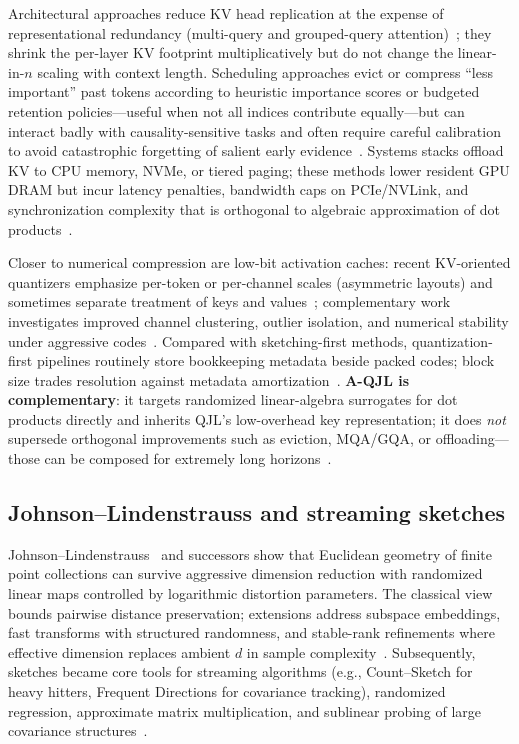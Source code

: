 \documentclass[conference]{IEEEtran}
\begin{document}
Architectural approaches reduce KV head replication at the expense of representational redundancy (multi-query and grouped-query attention)~\cite{shazeer2019mqa}; they shrink the per-layer KV footprint multiplicatively but do not change the linear-in-\(n\) scaling with context length. Scheduling approaches evict or compress ``less important'' past tokens according to heuristic importance scores or budgeted retention policies---useful when not all indices contribute equally---but can interact badly with causality-sensitive tasks and often require careful calibration to avoid catastrophic forgetting of salient early evidence~\cite{bai2023longbench}. Systems stacks offload KV to CPU memory, NVMe, or tiered paging; these methods lower resident GPU DRAM but incur latency penalties, bandwidth caps on PCIe/NVLink, and synchronization complexity that is orthogonal to algebraic approximation of dot products~\cite{presentation_mqjl}.

Closer to numerical compression are low-bit activation caches: recent KV-oriented quantizers emphasize per-token or per-channel scales (asymmetric layouts) and sometimes separate treatment of keys and values~\cite{kivi2024}; complementary work investigates improved channel clustering, outlier isolation, and numerical stability under aggressive codes~\cite{kvquant2023}. Compared with sketching-first methods, quantization-first pipelines routinely store bookkeeping metadata beside packed codes; block size trades resolution against metadata amortization~\cite{kivi2024}. \textbf{A-QJL is complementary}: it targets randomized linear-algebra surrogates for dot products directly and inherits QJL's low-overhead key representation; it does \emph{not} supersede orthogonal improvements such as eviction, MQA/GQA, or offloading---those can be composed for extremely long horizons~\cite{shazeer2019mqa,zandieh2024qjl}.

\subsection{Johnson--Lindenstrauss and streaming sketches}

Johnson--Lindenstrauss~\cite{jl1984} and successors show that Euclidean geometry of finite point collections can survive aggressive dimension reduction with randomized linear maps controlled by logarithmic distortion parameters. The classical view bounds pairwise distance preservation; extensions address subspace embeddings, fast transforms with structured randomness, and stable-rank refinements where effective dimension replaces ambient \(d\) in sample complexity~\cite{woodruff2014,rudelson2014}. Subsequently, sketches became core tools for streaming algorithms (e.g., Count--Sketch for heavy hitters, Frequent Directions for covariance tracking), randomized regression, approximate matrix multiplication, and sublinear probing of large covariance structures~\cite{woodruff2014}.
\end{document}
